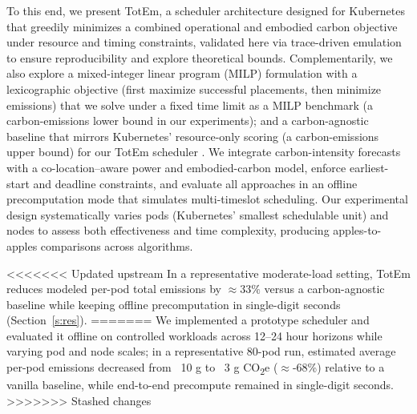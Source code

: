 \documentclass[10pt,journal,compsoc]{IEEEtran}
\begin{document}
To this end, we present TotEm, a scheduler architecture designed for Kubernetes that greedily minimizes a combined operational and embodied carbon objective under resource and timing constraints, validated here via trace-driven emulation to ensure reproducibility and explore theoretical bounds. Complementarily, we also explore a mixed-integer linear program (MILP) formulation with a lexicographic objective (first maximize successful placements, then minimize emissions) that we solve under a fixed time limit as a MILP benchmark (a carbon-emissions lower bound in our experiments); and a carbon-agnostic baseline that mirrors Kubernetes’ resource-only scoring (a carbon-emissions upper bound) for our TotEm scheduler \cite{KubernetesSchedulingFramework2025}. We integrate carbon-intensity forecasts with a co-location–aware power and embodied-carbon model, enforce earliest-start and deadline constraints, and evaluate all approaches in an offline precomputation mode that simulates multi-timeslot scheduling. Our experimental design systematically varies pods (Kubernetes’ smallest schedulable unit) and nodes to assess both effectiveness and time complexity, producing apples-to-apples comparisons across algorithms.

<<<<<<< Updated upstream
In a representative moderate-load setting, TotEm reduces modeled per-pod total emissions by \(\approx 33\%\) versus a carbon-agnostic baseline while keeping offline precomputation in single-digit seconds (Section~\ref{s:res}).
=======
We implemented a prototype scheduler and evaluated it offline on controlled workloads across 12–24 hour horizons while varying pod and node scales; in a representative 80-pod run, estimated average per-pod emissions decreased from ~10 g to ~3 g CO\textsubscript{2}e (\(\approx\)-68\%) relative to a vanilla baseline, while end-to-end precompute remained in single-digit seconds.
>>>>>>> Stashed changes


\end{document}
